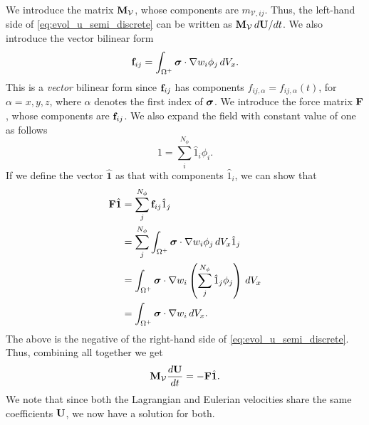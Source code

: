 \documentclass[11pt]{report}
\begin{document}
We introduce the matrix $\mathbf{M}_\mathcal{V}$, whose components are $m_{\mathcal{V},ij}$. Thus, the left-hand side of \cref{eq:evol_u_semi_discrete} can be written as $\mathbf{M}_\mathcal{V} \, d\mathbf{U} / dt$.
We also introduce the vector bilinear form
\begin{equation}
    \mathbf{f}_{ij} = \int_{\Omega^+} \bm \sigma \cdot \nabla w_i \phi_j \, dV_x.
\end{equation}
This is a \textit{vector} bilinear form since $\mathbf{f}_{ij}$ has components $f_{ij,\alpha} = f_{ij,\alpha}(t)$, for $\alpha = x,y,z$, where $\alpha$ denotes the first index of $\bm \sigma$. We introduce the force matrix $\mathbf{F}$, whose components are $\mathbf{f}_{ij}$. We also expand the field with constant value of one as follows
\begin{equation*}
    1 = \sum_i^{N_\phi} \hat{1}_i \phi_i.
\end{equation*}
If we define the vector $\hat{\mathbf{1}}$ as that with components $\hat{1}_i$, we can show that 
\begin{align*}
    \mathbf{F} \hat{\mathbf{1}} &= \sum_j^{N_\phi} \mathbf{f}_{ij} \hat{1}_j \nonumber \\
    &= \sum_j^{N_\phi} \int_{\Omega^+} \bm \sigma \cdot \nabla w_i \phi_j \, dV_x \hat{1}_j \nonumber \\
    &= \int_{\Omega^+} \bm \sigma \cdot \nabla w_i \left ( \sum_j^{N_\phi} \hat{1}_j \phi_j \right ) \, dV_x \nonumber \\
    &= \int_{\Omega^+} \bm \sigma \cdot \nabla w_i \, dV_x.
\end{align*}
The above is the negative of the right-hand side of \cref{eq:evol_u_semi_discrete}. Thus, combining all together we get
\begin{equation}
    \label{eq:evol_vel_semi_discrete}
    \mathbf{M}_\mathcal{V} \frac{d\mathbf{U}}{dt} = -\mathbf{F} \hat{\mathbf{1}}.
\end{equation}
We note that since both the Lagrangian and Eulerian velocities share the same coefficients $\mathbf{U}$, we now have a solution for both.

\end{document}
